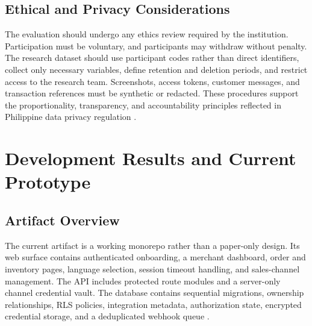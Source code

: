 \documentclass[12pt,oneside]{report}
\begin{document}
\section{Ethical and Privacy Considerations}
The evaluation should undergo any ethics review required by the institution.
Participation must be voluntary, and participants may withdraw without penalty.
The research dataset should use participant codes rather than direct
identifiers, collect only necessary variables, define retention and deletion
periods, and restrict access to the research team. Screenshots, access tokens,
customer messages, and transaction references must be synthetic or redacted.
These procedures support the proportionality, transparency, and accountability
principles reflected in Philippine data privacy regulation
\parencite{philippines2012dpa}.

\chapter{Development Results and Current Prototype}

\section{Artifact Overview}
The current artifact is a working monorepo rather than a paper-only design. Its
web surface contains authenticated onboarding, a merchant dashboard, order and
inventory pages, language selection, session timeout handling, and sales-channel
management. The API includes protected route modules and a server-only channel
credential vault. The database contains sequential migrations, ownership
relationships, RLS policies, integration metadata, authorization state,
encrypted credential storage, and a deduplicated webhook queue
\parencite{sariSoftware2026}.
\end{document}
